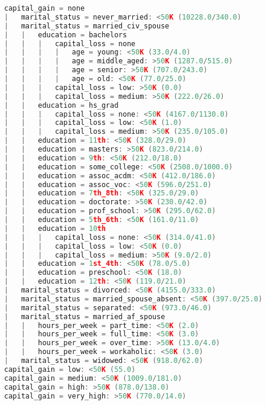 \documentclass[a4paper]{llncs}
\begin{document}
\begin{lstlisting}[language=c,frame=single,breaklines=true,basicstyle=\footnotesize\ttfamily,caption={Decision tree built by C4.5 with -C 0.05},label=decision_tree_c45]
capital_gain = none
|   marital_status = never_married: <50K (10228.0/340.0)
|   marital_status = married_civ_spouse
|   |   education = bachelors
|   |   |   capital_loss = none
|   |   |   |   age = young: <50K (33.0/4.0)
|   |   |   |   age = middle_aged: >50K (1287.0/515.0)
|   |   |   |   age = senior: >50K (707.0/243.0)
|   |   |   |   age = old: <50K (77.0/25.0)
|   |   |   capital_loss = low: >50K (0.0)
|   |   |   capital_loss = medium: >50K (222.0/26.0)
|   |   education = hs_grad
|   |   |   capital_loss = none: <50K (4167.0/1130.0)
|   |   |   capital_loss = low: <50K (1.0)
|   |   |   capital_loss = medium: >50K (235.0/105.0)
|   |   education = 11th: <50K (328.0/29.0)
|   |   education = masters: >50K (823.0/214.0)
|   |   education = 9th: <50K (212.0/18.0)
|   |   education = some_college: <50K (2508.0/1000.0)
|   |   education = assoc_acdm: <50K (412.0/186.0)
|   |   education = assoc_voc: <50K (596.0/251.0)
|   |   education = 7th_8th: <50K (325.0/29.0)
|   |   education = doctorate: >50K (230.0/42.0)
|   |   education = prof_school: >50K (295.0/62.0)
|   |   education = 5th_6th: <50K (161.0/11.0)
|   |   education = 10th
|   |   |   capital_loss = none: <50K (314.0/41.0)
|   |   |   capital_loss = low: <50K (0.0)
|   |   |   capital_loss = medium: >50K (9.0/2.0)
|   |   education = 1st_4th: <50K (78.0/5.0)
|   |   education = preschool: <50K (18.0)
|   |   education = 12th: <50K (119.0/21.0)
|   marital_status = divorced: <50K (4155.0/333.0)
|   marital_status = married_spouse_absent: <50K (397.0/25.0)
|   marital_status = separated: <50K (973.0/46.0)
|   marital_status = married_af_spouse
|   |   hours_per_week = part_time: <50K (2.0)
|   |   hours_per_week = full_time: <50K (3.0)
|   |   hours_per_week = over_time: >50K (13.0/4.0)
|   |   hours_per_week = workaholic: <50K (3.0)
|   marital_status = widowed: <50K (918.0/62.0)
capital_gain = low: <50K (55.0)
capital_gain = medium: <50K (1009.0/181.0)
capital_gain = high: >50K (878.0/138.0)
capital_gain = very_high: >50K (770.0/14.0)
\end{lstlisting}
\end{document}
